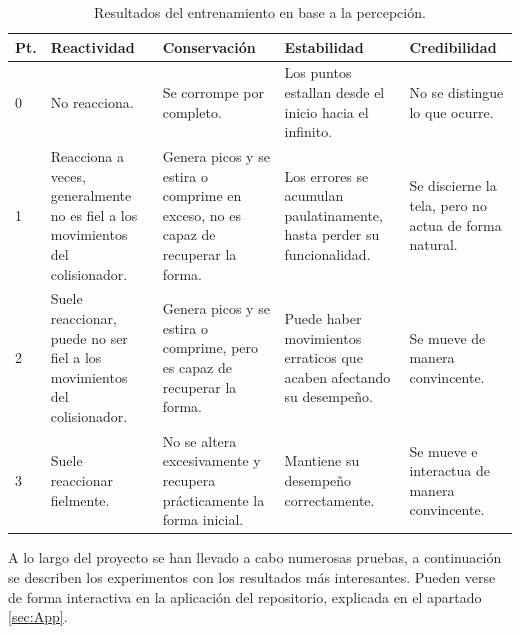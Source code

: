   \begin{table}[H]
    \begin{center}
        \begin{tabular}{ | m{0.6cm} |  m{3cm} | m{3cm} | m{3cm} | m{3cm} |}
        \hline \textbf{Pt.} & \textbf{Reactividad} & \textbf{Conservación} & \textbf{Estabilidad} & \textbf{Credibilidad} \\ \hline
            0 
            & No reacciona. 
            & Se corrompe por completo.
            & Los puntos estallan desde el inicio hacia el infinito.
            & No se distingue lo que ocurre.
            \\ \hline            
            1 
            & Reacciona a veces, generalmente no es fiel a los movimientos del colisionador. 
            & Genera picos y se estira o comprime en exceso, no es capaz de recuperar la forma.
            & Los errores se acumulan paulatinamente, hasta perder su funcionalidad.
            & Se discierne la tela, pero no actua de forma natural.
            \\ \hline
            2 
            & Suele reaccionar, puede no ser fiel a los movimientos del colisionador. 
            & Genera picos y se estira o comprime, pero es capaz de recuperar la forma.
            & Puede haber movimientos erraticos que acaben afectando su desempeño. 
            & Se mueve de manera convincente.
            \\ \hline
            3 
            & Suele reaccionar fielmente. 
            & No se altera excesivamente y recupera prácticamente la forma inicial.
            & Mantiene su desempeño correctamente. 
            & Se mueve e interactua de manera convincente.
            \\ \hline
        \end{tabular}
    \end{center}
    \caption{Resultados del entrenamiento en base a la percepción.}
    \label{tab:rubrica}
    \end{table}

    
A lo largo del proyecto se han llevado a cabo numerosas pruebas, a continuación se describen los experimentos con los resultados más interesantes. Pueden verse de forma interactiva en la aplicación del repositorio, explicada en el apartado \ref{sec:App}.

